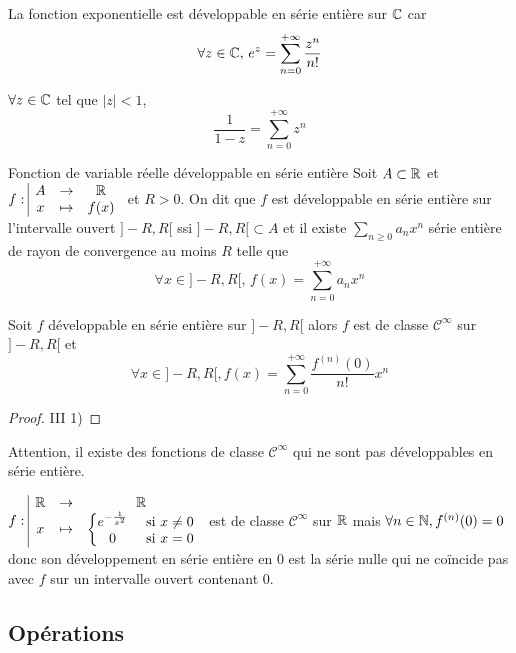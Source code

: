 \begin{exemple}
    La fonction exponentielle est développable en série entière sur $\mathbb{C}$ car 
    $$\forall z \in \mathbb{C}, \, e^z = \sum_{n = 0}^{+\infty} \frac{z^n}{n!}$$

    \lvspace $\forall z \in \mathbb{C}$ tel que $|z| < 1$,
    $$\frac 1 {1 - z} = \sum_{n = 0}^{+\infty} z^n$$
\end{exemple}

\begin{definitionnt}{Fonction de variable réelle développable en série entière}{}
    Soit $A \subset \mathbb{R}$ et $f: \space \begin{array}{|ccc} \displaystyle A & \to & \displaystyle \mathbb{R} \\ \displaystyle x & \mapsto & \displaystyle f(x) \end{array}$ et $R > 0$. On dit que $f$ est développable
    en série entière sur l'intervalle ouvert $]-R, R[$ ssi $]-R, R[ \subset A$ et il 
    existe $\sum_{n \geqslant 0 } a_n x^n$ série entière de rayon de convergence au moins $R$ telle que
    $$\forall x \in ]-R, R[, \, f(x) = \sum_{n = 0}^{+\infty} a_n x^n$$
\end{definitionnt}

\begin{proposition}{}{}
    Soit $f$ développable en série entière sur $] - R, R[$ alors $f$ est de classe
    $\mathscr {C}^\infty$ sur $]-R, R[$ et 
    $$\forall x \in ]-R, R[, 
    f(x) = \sum_{n = 0}^{+\infty} \frac{f^{(n)}(0)}{n!} x^n$$
\end{proposition}

\begin{proof}
    III 1)
\end{proof}

\begin{remarque}
    Attention, il existe des fonctions de classe $\mathscr {C}^\infty$ qui ne sont pas
    développables en série entière.
\end{remarque}

\begin{exemple}
    $f: \space \begin{array}{|ccc} \displaystyle \mathbb{R} & \to & \displaystyle \mathbb{R} \\ \displaystyle x & \mapsto & \displaystyle \left\{ \begin{matrix}
        e^{- \frac 1 {x^2}} & \text{ si } x \neq 0 \\
        0 & \text{ si } x = 0
    \end{matrix} \right. \end{array}$ est de classe $\mathscr {C}^\infty$ sur $\mathbb{R}$ mais 
    $\forall n \in \mathbb{N}, f^{(n)}(0) = 0$ donc son développement en série entière en $0$ est
    la série nulle qui ne coïncide pas avec $f$ sur un intervalle ouvert contenant $0$.
\end{exemple}

\subsection{Opérations}

